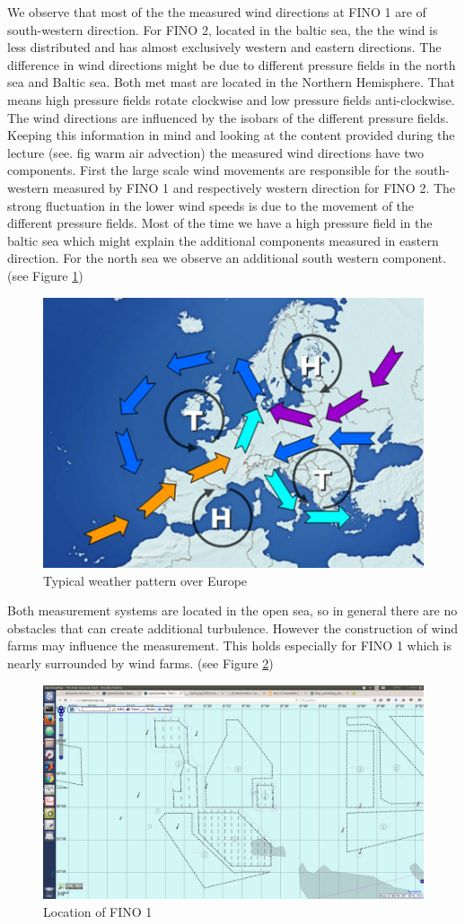 \documentclass[10pt]{article}
\begin{document}
We observe that most of the the measured wind directions at FINO 1 are of south-western direction. For FINO 2, located in the baltic sea, the the wind is less distributed and has almost exclusively western and eastern directions. The difference in wind directions might be due to different pressure fields in the north sea and Baltic sea. Both met mast are located in the Northern Hemisphere. That means high pressure fields rotate clockwise and low pressure fields anti-clockwise. The wind directions are influenced by the isobars of the different pressure fields. Keeping this information in mind and looking at the content provided during the lecture (see. fig warm air advection) the measured wind directions have two components. First the large scale wind movements are responsible for the south-western measured by FINO 1 and respectively western direction for FINO 2. The strong fluctuation in the lower wind speeds is due to the movement of the different pressure fields. Most of the time we have a high pressure field in the baltic sea which might explain the additional components measured in eastern direction. For the north sea we observe an additional south western component. (see Figure \ref{fig:weatherpattern})\\

\begin{figure}[H]
\centering
\includegraphics[width=0.5\linewidth]{../figures/warm_air_advection.png}
\caption{Typical weather pattern over Europe}
\label{fig:weatherpattern}
\end{figure}

Both measurement systems are located in the open sea, so in general there are no obstacles that can create additional turbulence. However the construction of wind farms may influence the measurement. This holds especially for FINO 1 which is nearly surrounded by wind farms. (see Figure \ref{fig:fino1})\\

\begin{figure}[H]
\centering
\includegraphics[width=0.5\linewidth]{../figures/fino1.png}
\caption{Location of FINO 1}
\label{fig:fino1}
\end{figure} 
 
\end{document}
